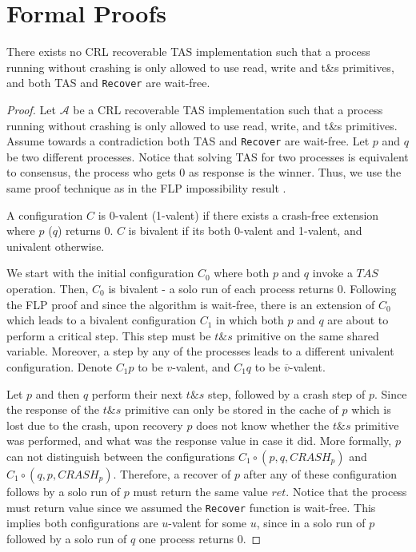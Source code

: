 
\section{Formal Proofs}


\begin{claim}
	There exists no CRL recoverable TAS implementation such that a process running without crashing is only allowed to use read, write and t\&s primitives, and both TAS and \texttt{Recover} are wait-free.
\end{claim}

\begin{proof}
	Let $\mathcal{A}$ be a CRL recoverable TAS implementation such that a process running without crashing is only allowed to use read, write, and t\&s primitives. Assume towards a contradiction both TAS and \texttt{Recover} are wait-free.
	Let $p$ and $q$ be two different processes. Notice that solving TAS for two processes is equivalent to consensus, the process who gets 0 as response is the winner. Thus, we use the same proof technique as in the FLP impossibility result \cite{DBLP:journals/jacm/FischerLP85}.
	
	A configuration $C$ is 0-valent (1-valent) if there exists a crash-free extension where $p$ ($q$) returns 0. $C$ is bivalent if its both 0-valent and 1-valent, and univalent otherwise.
	
	We start with the initial configuration $C_0$ where both $p$ and $q$ invoke a $TAS$ operation. Then, $C_0$ is bivalent - a solo run of each process returns 0. Following the FLP proof and since the algorithm is wait-free, there is an extension of $C_0$ which leads to a bivalent configuration $C_1$ in which both $p$ and $q$ are about to perform a critical step. This step must be $t\&s$ primitive on the same shared variable. Moreover, a step by any of the processes leads to a different univalent configuration. Denote $C_1 p$ to be $v$-valent, and $C_1 q$ to be $\overline{v}$-valent.
	
	Let $p$ and then $q$ perform their next $t\&s$ step, followed by a crash step of $p$. Since the response of the $t\&s$ primitive can only be stored in the cache of $p$ which is lost due to the crash, upon recovery $p$ does not know whether the $t\&s$ primitive was performed, and what was the response value in case it did. More formally, $p$ can not distinguish between the configurations $C_1 \circ (p,q,CRASH_p)$ and $C_1 \circ (q, p, CRASH_p)$. Therefore, a recover of $p$ after any of these configuration follows by a solo run of $p$ must return the same value $ret$. Notice that the process must return value since we assumed the \texttt{Recover} function is wait-free. This implies both configurations are $u$-valent for some $u$, since in a solo run of $p$ followed by a solo run of $q$ one process returns 0.
	

\end{proof}
